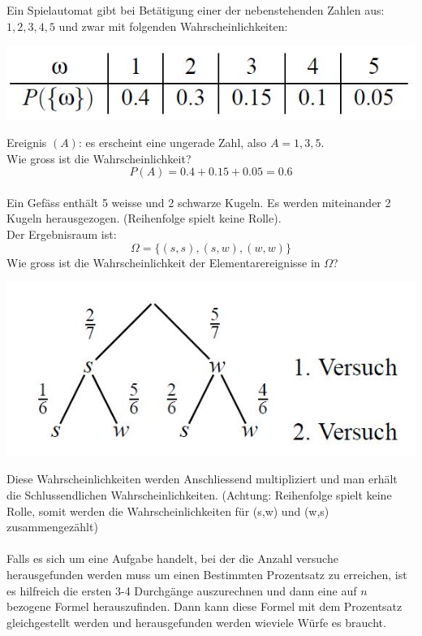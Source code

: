 \documentclass[12pt,a4paper]{article} %
\begin{document}
Ein Spielautomat gibt bei Betätigung einer der nebenstehenden Zahlen aus:\\$1,2,3,4,5$ und zwar mit folgenden Wahrscheinlichkeiten:
\begin{center}
\includegraphics[scale=0.5]{wahrscheinlichkeiten35.jpg}
\end{center}
Ereignis $(A)$: es erscheint eine ungerade Zahl, also $A=1,3,5$.\\
Wie gross ist die Wahrscheinlichkeit?\\
$$P(A) = 0.4 + 0.15 + 0.05 = 0.6$$
\\
Ein Gefäss enthält 5 weisse und 2 schwarze Kugeln. Es werden miteinander 2 Kugeln herausgezogen. (Reihenfolge spielt keine Rolle).\\
Der Ergebnisraum ist:
$$\Omega = \{ (s,s), (s,w), (w,w) \}$$
Wie gross ist die Wahrscheinlichkeit der Elementarereignisse in $\Omega$?
\pagebreak
\begin{center}
\includegraphics[scale=0.5]{baumstruktur37.jpg}
\end{center}
Diese Wahrscheinlichkeiten werden Anschliessend multipliziert und man erhält die Schlussendlichen Wahrscheinlichkeiten. (Achtung: Reihenfolge spielt keine Rolle, somit werden die Wahrscheinlichkeiten für (s,w) und (w,s) zusammengezählt)\\\\
Falls es sich um eine Aufgabe handelt, bei der die Anzahl versuche herausgefunden werden muss um einen Bestimmten Prozentsatz zu erreichen, ist es hilfreich die ersten 3-4 Durchgänge auszurechnen und dann eine auf $n$ bezogene Formel herauszufinden. Dann kann diese Formel mit dem Prozentsatz gleichgestellt werden und herausgefunden werden wieviele Würfe es braucht.
\end{document}
